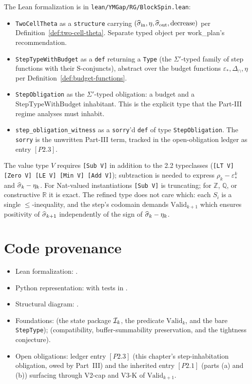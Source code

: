 The Lean formalization is in \texttt{lean/YMGap/RG/BlockSpin.lean}:
\begin{itemize}
  \item \texttt{TwoCellTheta} as a \texttt{structure} carrying $(\widehat{\sigma}_{\mathrm{in}}, \eta, \widehat{\sigma}_{\mathrm{out}}, \mathrm{decrease})$ per Definition~\ref{def:two-cell-theta}.  Separate typed object per work\_plan's recommendation.
  \item \texttt{StepTypeWithBudget} as a \texttt{def} returning a \texttt{Type} (the $\Sigma'$-typed family of step functions with their S-conjuncts), abstract over the budget functions $\varepsilon_*, \Delta_{\cap}, \eta$ per Definition~\ref{def:budget-functions}.
  \item \texttt{StepObligation} as the $\Sigma'$-typed obligation: a budget and a $\mathrm{StepTypeWithBudget}$ inhabitant.  This is the explicit type that the Part-III regime analyses must inhabit.
  \item \texttt{step\_obligation\_witness} as a \texttt{sorry}'d \texttt{def} of type \texttt{StepObligation}.  The \texttt{sorry} is the unwritten Part-III term, tracked in the open-obligation ledger as entry $[P2.3]$.
\end{itemize}
The value type $V$ requires \texttt{[Sub V]} in addition to the 2.2 typeclasses (\texttt{[LT V] [Zero V] [LE V] [Min V] [Add V]}); subtraction is needed to express $\rho_k - \varepsilon^k_*$ and $\widehat{\sigma}_k - \eta_k$.  For Nat-valued instantiations \texttt{[Sub V]} is truncating; for $\mathbb{Z}$, $\mathbb{Q}$, or constructive $\mathbb{R}$ it is exact.  The refined type does not care which: each $S_i$ is a single $\le$-inequality, and the step's codomain demands $\mathrm{Valid}_{k+1}$ which ensures positivity of $\widehat{\sigma}_{k+1}$ independently of the sign of $\widehat{\sigma}_k - \eta_k$.

\section{Code provenance}
\label{sec:block-spin-codeanchor}

\begin{itemize}
  \item Lean formalization:
    .
  \item Python representation: 
    with tests in .
  \item Structural diagram:
    .
  \item Foundations:  (the state package
    $\mathcal{I}_k$, the predicate $\mathrm{Valid}_k$, and the bare
    \texttt{StepType});\;
     (compatibility, buffer-summability
    preservation, and the tightness conjecture).
  \item Open obligations: ledger entry $[P2.3]$ (this chapter's
    step-inhabitation obligation, owed by Part~III) and the
    inherited entry $[P2.1]$ (parts (a) and (b)) surfacing through
    V2-cap and V3-K of $\mathrm{Valid}_{k+1}$.
\end{itemize}
